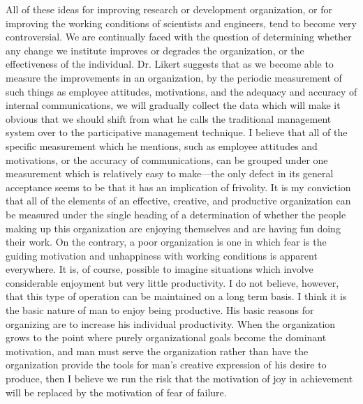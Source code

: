 \documentclass{memoir}
\begin{document}
All of these ideas for improving research or development organization, or for improving the working conditions of scientists and engineers, tend to become very controversial. We are continually faced with the question of determining whether any change we institute improves or degrades the organization, or the effectiveness of the individual. Dr. Likert suggests that as we become able to measure the improvements in an organization, by the periodic measurement of such things as employee attitudes, motivations, and the adequacy and accuracy of internal communications, we will gradually collect the data which will make it obvious that we should shift from what he calls the traditional management system over to the participative management technique. I believe that all of the specific measurement which he mentions, such as employee attitudes and motivations, or the accuracy of communications, can be grouped under one measurement which is relatively easy to make---the only defect in its general acceptance seems to be that it has an implication of frivolity. It is my conviction that all of the elements of an effective, creative, and productive organization can be measured under the single heading of a determination of whether the people making up this organization are enjoying themselves and are having fun doing their work. On the contrary, a poor organization is one in which fear is the guiding motivation and unhappiness with working conditions is apparent everywhere. It is, of course, possible to imagine situations which involve considerable enjoyment but very little productivity. I do not believe, however, that this type of operation can be maintained on a long term basis. I think it is the basic nature of man to enjoy being productive. His basic reasons for organizing are to increase his individual productivity. When the organization grows to the point where purely organizational goals become the dominant motivation, and man must serve the organization rather than have the organization provide the tools for man's creative expression of his desire to produce, then I believe we run the risk that the motivation of joy in achievement will be replaced by the motivation of fear of failure.
\end{document}
